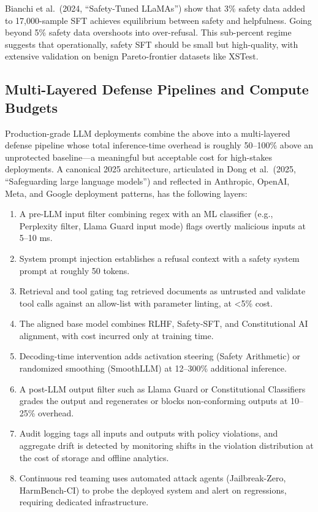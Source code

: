 \documentclass{article}
\begin{document}
Bianchi et al.~(2024, ``Safety-Tuned LLaMAs'') show that 3\% safety data added to 17,000-sample SFT achieves equilibrium between safety and helpfulness. Going beyond 5\% safety data overshoots into over-refusal. This sub-percent regime suggests that operationally, safety SFT should be small but high-quality, with extensive validation on benign Pareto-frontier datasets like XSTest.

\subsection{Multi-Layered Defense Pipelines and Compute Budgets}\label{multi-layered-defense-pipelines-and-compute-budgets}

Production-grade LLM deployments combine the above into a multi-layered defense pipeline whose total inference-time overhead is roughly 50--100\% above an unprotected baseline---a meaningful but acceptable cost for high-stakes deployments. A canonical 2025 architecture, articulated in Dong et al.~(2025, ``Safeguarding large language models'') and reflected in Anthropic, OpenAI, Meta, and Google deployment patterns, has the following layers:

\begin{enumerate}
\def\labelenumi{\arabic{enumi}.}

\item
  A pre-LLM input filter combining regex with an ML classifier (e.g., Perplexity filter, Llama Guard input mode) flags overtly malicious inputs at 5--10 ms.
\item
  System prompt injection establishes a refusal context with a safety system prompt at roughly 50 tokens.
\item
  Retrieval and tool gating tag retrieved documents as untrusted and validate tool calls against an allow-list with parameter linting, at \textless5\% cost.
\item
  The aligned base model combines RLHF, Safety-SFT, and Constitutional AI alignment, with cost incurred only at training time.
\item
  Decoding-time intervention adds activation steering (Safety Arithmetic) or randomized smoothing (SmoothLLM) at 12--300\% additional inference.
\item
  A post-LLM output filter such as Llama Guard or Constitutional Classifiers grades the output and regenerates or blocks non-conforming outputs at 10--25\% overhead.
\item
  Audit logging tags all inputs and outputs with policy violations, and aggregate drift is detected by monitoring shifts in the violation distribution at the cost of storage and offline analytics.
\item
  Continuous red teaming uses automated attack agents (Jailbreak-Zero, HarmBench-CI) to probe the deployed system and alert on regressions, requiring dedicated infrastructure.
\end{enumerate}
\end{document}
